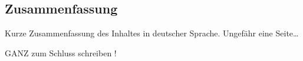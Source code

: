 \begin{otherlanguage}{ngerman}
	\chapter*{Zusammenfassung}
	Kurze Zusammenfassung des Inhaltes in deutscher Sprache. Ungefähr eine Seite\dots
	
	

                        GANZ zum Schluss schreiben !


\end{otherlanguage}
